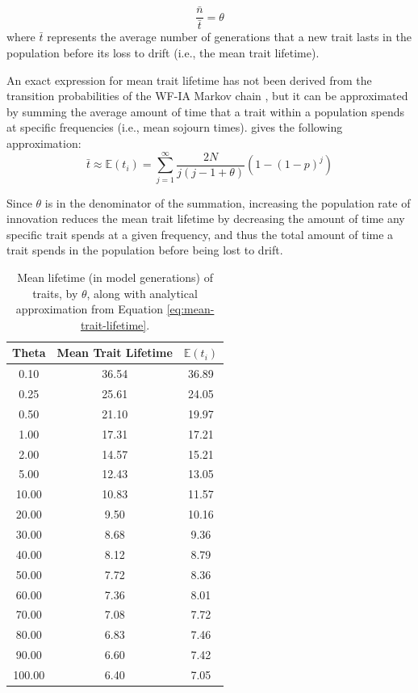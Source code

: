 \begin{equation}
\label{eq:nug}
\frac{\bar{n}}{\bar{t}} = \theta
\end{equation}
where $\bar{t}$ represents the average number of generations that a new trait lasts in the population before its loss to drift (i.e., the mean trait lifetime).  

An exact expression for mean trait lifetime has not been derived from the transition probabilities of the WF-IA Markov chain \citep{ewens1964maintenance}, but it can be approximated by summing the average amount of time that a trait within a population spends at specific frequencies (i.e., mean sojourn times).  \citet[Eq. 3.20]{Ewens2004} gives the following approximation:
\begin{equation}
	\label{eq:mean-trait-lifetime}
	\bar{t} \approx \mathbb{E}(t_i) = \sum _{j=1}^{\infty } \frac{2N}{j(j-1+ \theta )}(1-(1-p)^j)
\end{equation}

Since $\theta$ is in the denominator of the summation, increasing the population rate of innovation reduces the mean trait lifetime by decreasing the amount of time any specific trait spends at a given frequency, and thus the total amount of time a trait spends in the population before being lost to drift.   

\begin{table}[ht]
\begin{tabular}{|c|c|c|}
  \hline
Theta & Mean Trait Lifetime & $\mathbb{E}(t_i)$ \\
  \hline
0.10 & 36.54 & 36.89 \\ 
  0.25 & 25.61 & 24.05 \\ 
  0.50 & 21.10 & 19.97 \\ 
  1.00 & 17.31 & 17.21 \\ 
  2.00 & 14.57 & 15.21 \\ 
  5.00 & 12.43 & 13.05 \\ 
  10.00 & 10.83 & 11.57\\ 
  20.00 & 9.50 & 10.16 \\ 
  30.00 & 8.68 & 9.36 \\ 
  40.00 & 8.12 & 8.79 \\ 
  50.00 & 7.72 & 8.36 \\ 
  60.00 & 7.36 & 8.01\\ 
  70.00 & 7.08 & 7.72 \\ 
  80.00 & 6.83 & 7.46 \\ 
  90.00 & 6.60 & 7.42 \\ 
  100.00 & 6.40 & 7.05 \\ 
   \hline
\end{tabular}
\caption{Mean lifetime (in model generations) of traits, by $\theta$, along with analytical approximation from Equation \ref{eq:mean-trait-lifetime}.}
\label{tab:mean-trait-lifetime}
\end{table}

